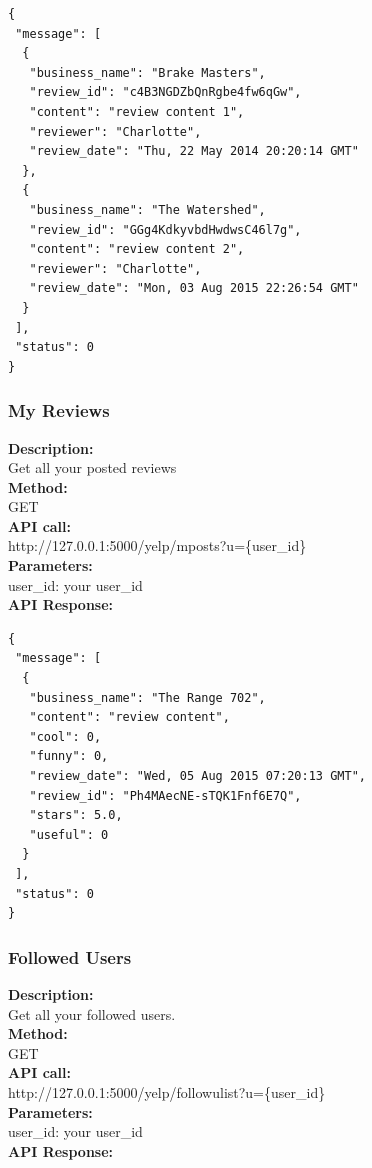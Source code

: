 \documentclass[12pt]{article}
\begin{document}
\begin{singlespacing}
\begin{lstlisting}
{
 "message": [
  {
   "business_name": "Brake Masters",
   "review_id": "c4B3NGDZbQnRgbe4fw6qGw",
   "content": "review content 1",
   "reviewer": "Charlotte",
   "review_date": "Thu, 22 May 2014 20:20:14 GMT"
  },
  {
   "business_name": "The Watershed",
   "review_id": "GGg4KdkyvbdHwdwsC46l7g",
   "content": "review content 2",
   "reviewer": "Charlotte",
   "review_date": "Mon, 03 Aug 2015 22:26:54 GMT"
  }
 ],
 "status": 0
}
\end{lstlisting}
\end{singlespacing}

\subsubsection{My Reviews}
\textbf{Description:}\\
Get all your posted reviews\\
\textbf{Method:}\\
GET\\
\textbf{API call:}\\ 
http://127.0.0.1:5000/yelp/mposts?u=\{user\_id\}\\
\textbf{Parameters:}\\
user\_id: your user\_id\\
\textbf{API Response:}

\begin{singlespacing}
\begin{lstlisting}
{
 "message": [
  {
   "business_name": "The Range 702",
   "content": "review content",
   "cool": 0,
   "funny": 0,
   "review_date": "Wed, 05 Aug 2015 07:20:13 GMT",
   "review_id": "Ph4MAecNE-sTQK1Fnf6E7Q",
   "stars": 5.0,
   "useful": 0
  }
 ],
 "status": 0
}
\end{lstlisting}
\end{singlespacing}

\subsubsection{Followed Users}
\textbf{Description:}\\
Get all your followed users.\\
\textbf{Method:}\\
GET\\
\textbf{API call:}\\ 
http://127.0.0.1:5000/yelp/followulist?u=\{user\_id\}\\
\textbf{Parameters:}\\
user\_id: your user\_id\\
\textbf{API Response:}
\end{document}

